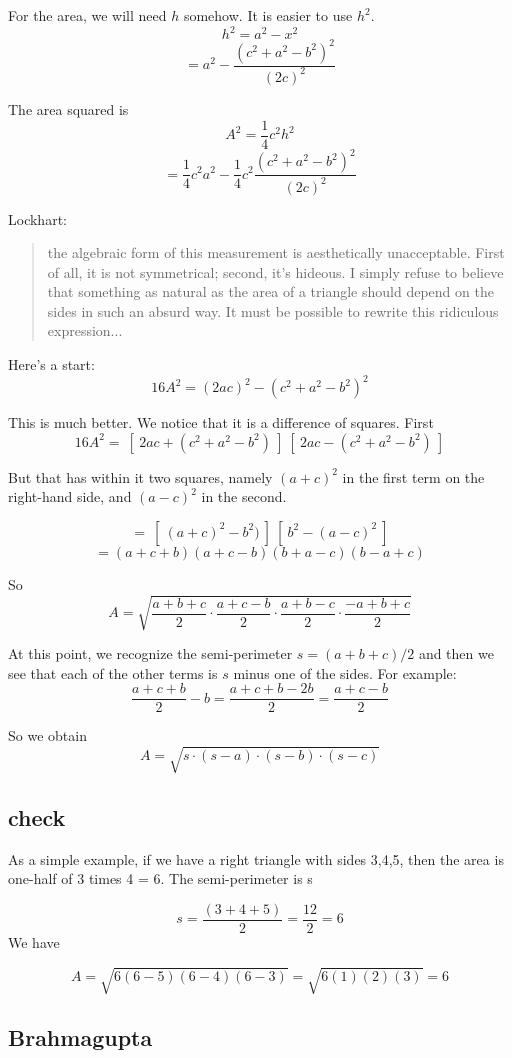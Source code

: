 \documentclass[11pt, oneside]{article}
\begin{document}
For the area, we will need $h$ somehow.  It is easier to use $h^2$.
\[ h^2 = a^2 - x^2 \]
\[ = a^2 - \frac{(c^2 + a^2-b^2)^2}{(2c)^2}  \]

The area squared is
\[ A^2 = \frac{1}{4}c^2 h^2 \]
\[ = \frac{1}{4} c^2 a^2 - \frac{1}{4} c^2 \frac{(c^2 + a^2-b^2)^2}{(2c)^2}  \]

Lockhart:

\begin{quote}
the algebraic form of this measurement is aesthetically unacceptable. First of all, it is not symmetrical; second, it's hideous. I simply refuse to believe that something as natural as the area of a triangle should depend on the sides in such an absurd way. It must be possible to rewrite this ridiculous expression...
\end{quote}

Here's a start:
\[ 16A^2 = (2ac)^2 - (c^2 + a^2-b^2)^2 \]

This is much better.  We notice that it is a difference of squares.  First
\[ 16A^2 = \ [ \ 2ac + (c^2 + a^2-b^2) \ ] \ [ \ 2ac - (c^2 + a^2-b^2) \ ]  \]

But that has within it two squares, namely $(a + c)^2$ in the first term on the right-hand side, and $(a - c)^2$ in the second.

\[ = \ [ \ (a + c)^2 -b^2) \ ] \ [ \ b^2 - (a - c)^2 \ ]  \]
\[ =  (a + c + b)(a + c - b)(b + a - c)(b - a + c) \]

So
\[ A = \sqrt{\frac{a + b + c}{2}  \cdot \frac{a + c - b}{2}  \cdot \frac{a + b - c}{2}  \cdot \frac{-a + b + c}{2} } \]

At this point, we recognize the semi-perimeter $s = (a + b + c)/2$ and then we see that each of the other terms is $s$ minus one of the sides.  For example:
\[ \frac{a + c + b}{2} - b = \frac{a + c + b - 2b}{2} = \frac{a + c - b}{2} \]

So we obtain
\[ A = \sqrt{s \cdot (s - a) \cdot (s - b) \cdot (s - c) } \]
\subsection*{check}
As a simple example, if we have a right triangle with sides 3,4,5, then the area is one-half of 3 times 4 = 6.  The semi-perimeter is s

\[ s = \frac{(3 + 4 + 5)}{2} = \frac{12}{2} = 6 \]
We have

\[ A =  \sqrt { 6 (6-5) (6-4) (6-3) } =  \sqrt { 6 (1) (2) (3) } = 6 \]

\subsection*{Brahmagupta}
\end{document}

